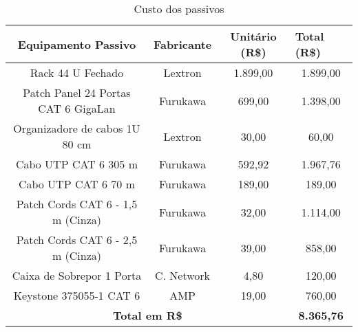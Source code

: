 \begin{table}[h!]
		\begin{center}
	\caption{Custo dos passivos}
	\label{tab10}
	\renewcommand{\arraystretch}{1.2}
\begin{tabular}{|c|c|c|c|}
	\hline
	\textbf{Equipamento Passivo}                 & \textbf{Fabricante} & \textbf{ Unitário (R\$)} & \multicolumn{1}{l|}{\textbf{Total (R\$)}} \\ \hline
	Rack 44 U Fechado                            & Lextron             & 1.899,00                         & 1.899,00                                           \\ \hline
	Patch Panel 24 Portas CAT 6 GigaLan  & Furukawa            & 699,00                           & 1.398,00                                           \\ \hline
	Organizadore de cabos 1U 80 cm               & Lextron             & 30,00                            & 60,00                                              \\ \hline
	Cabo UTP CAT 6  305 m           & Furukawa            & 592,92                           & 1.967,76                                           \\ \hline
	Cabo UTP CAT 6  70 m            & Furukawa            & 189,00                           & 189,00                                             \\ \hline
	Patch Cords CAT 6 - 1,5 m (Cinza)            & Furukawa            & 32,00                            & 1.114,00                                           \\ \hline
	Patch Cords CAT 6 - 2,5 m (Cinza)            & Furukawa            & 39,00                            & 858,00                                             \\ \hline
	Caixa de Sobrepor 1 Porta                          & C. Network                & 4,80                             & 120,00                                             \\ \hline
	Keystone 375055-1
	CAT 6                             & AMP                 & 19,00                            & 760,00                                             \\ \hline
	\multicolumn{3}{|c|}{\textbf{Total em R\$}}                                                           & \textbf{8.365,76}                                  \\ \hline
\end{tabular}
\end{center}
\end{table}